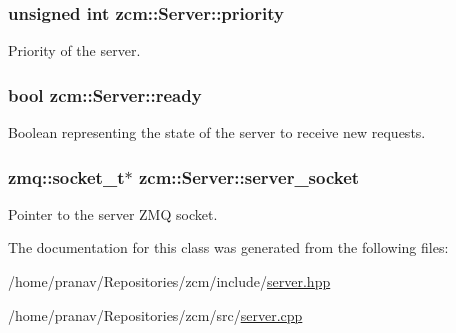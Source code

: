 \subsubsection[{\texorpdfstring{priority}{priority}}]{\setlength{\rightskip}{0pt plus 5cm}unsigned int zcm\+::\+Server\+::priority\hspace{0.3cm}{\ttfamily [private]}}\hypertarget{classzcm_1_1Server_ad088a068dc025ff7aa4bf560cc7c43c1}{}\label{classzcm_1_1Server_ad088a068dc025ff7aa4bf560cc7c43c1}


Priority of the server. 

\subsubsection[{\texorpdfstring{ready}{ready}}]{\setlength{\rightskip}{0pt plus 5cm}bool zcm\+::\+Server\+::ready\hspace{0.3cm}{\ttfamily [private]}}\hypertarget{classzcm_1_1Server_a709ad2426e77a5e442d70a762cbe504b}{}\label{classzcm_1_1Server_a709ad2426e77a5e442d70a762cbe504b}


Boolean representing the state of the server to receive new requests. 

\subsubsection[{\texorpdfstring{server\+\_\+socket}{server_socket}}]{\setlength{\rightskip}{0pt plus 5cm}zmq\+::socket\+\_\+t$\ast$ zcm\+::\+Server\+::server\+\_\+socket\hspace{0.3cm}{\ttfamily [private]}}\hypertarget{classzcm_1_1Server_a4312bf38cfd6bb1d169d6bd3682651e3}{}\label{classzcm_1_1Server_a4312bf38cfd6bb1d169d6bd3682651e3}


Pointer to the server Z\+MQ socket. 



The documentation for this class was generated from the following files\+:\begin{DoxyCompactItemize}
\item 
/home/pranav/\+Repositories/zcm/include/\hyperlink{server_8hpp}{server.\+hpp}\item 
/home/pranav/\+Repositories/zcm/src/\hyperlink{server_8cpp}{server.\+cpp}\end{DoxyCompactItemize}
